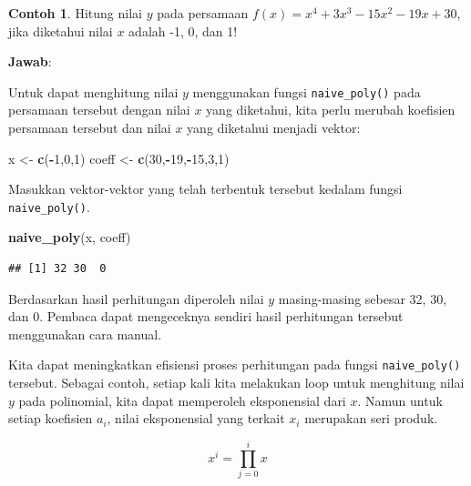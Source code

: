 \documentclass[
]{book}
\newenvironment{Shaded}{\begin{snugshade}}{\end{snugshade}}
\newcommand{\DecValTok}[1]{\textcolor[rgb]{0.00,0.00,0.81}{#1}}
\newcommand{\FunctionTok}[1]{\textcolor[rgb]{0.13,0.29,0.53}{\textbf{#1}}}
\newcommand{\NormalTok}[1]{#1}
\newcommand{\OtherTok}[1]{\textcolor[rgb]{0.56,0.35,0.01}{#1}}
\newcommand{\SpecialCharTok}[1]{\textcolor[rgb]{0.81,0.36,0.00}{\textbf{#1}}}
\theoremstyle{definition}
\theoremstyle{definition}
\newtheorem{example}{Contoh}[chapter]
\theoremstyle{definition}
\theoremstyle{definition}
\theoremstyle{remark}
\begin{document}
\begin{example}
\protect\hypertarget{exm:polievalexmp}{}\label{exm:polievalexmp}Hitung nilai \(y\) pada persamaan \(f\left(x\right)=x^4+3x^3-15x^2-19x+30\), jika diketahui nilai \(x\) adalah -1, 0, dan 1!
\end{example}

\textbf{Jawab}:

Untuk dapat menghitung nilai \(y\) menggunakan fungsi \texttt{naive\_poly()} pada persamaan tersebut dengan nilai \(x\) yang diketahui, kita perlu merubah koefisien persamaan tersebut dan nilai \(x\) yang diketahui menjadi vektor:

\begin{Shaded}
\begin{Highlighting}[]
\NormalTok{x }\OtherTok{\textless{}{-}} \FunctionTok{c}\NormalTok{(}\SpecialCharTok{{-}}\DecValTok{1}\NormalTok{,}\DecValTok{0}\NormalTok{,}\DecValTok{1}\NormalTok{)}
\NormalTok{coeff }\OtherTok{\textless{}{-}} \FunctionTok{c}\NormalTok{(}\DecValTok{30}\NormalTok{,}\SpecialCharTok{{-}}\DecValTok{19}\NormalTok{,}\SpecialCharTok{{-}}\DecValTok{15}\NormalTok{,}\DecValTok{3}\NormalTok{,}\DecValTok{1}\NormalTok{)}
\end{Highlighting}
\end{Shaded}

Masukkan vektor-vektor yang telah terbentuk tersebut kedalam fungsi \texttt{naive\_poly()}.

\begin{Shaded}
\begin{Highlighting}[]
\FunctionTok{naive\_poly}\NormalTok{(x, coeff)}
\end{Highlighting}
\end{Shaded}

\begin{verbatim}
## [1] 32 30  0
\end{verbatim}

Berdasarkan hasil perhitungan diperoleh nilai \(y\) masing-masing sebesar 32, 30, dan 0. Pembaca dapat mengeceknya sendiri hasil perhitungan tersebut menggunakan cara manual.

Kita dapat meningkatkan efisiensi proses perhitungan pada fungsi \texttt{naive\_poly()} tersebut. Sebagai contoh, setiap kali kita melakukan loop untuk menghitung nilai \(y\) pada polinomial, kita dapat memperoleh eksponensial dari \(x\). Namun untuk setiap koefisien \(a_i\), nilai eksponensial yang terkait \(x_i\) merupakan seri produk.

\begin{equation}
x^i=\prod_{j=0}^ix
  \label{eq:evalpoly2}
\end{equation}
\end{document}
